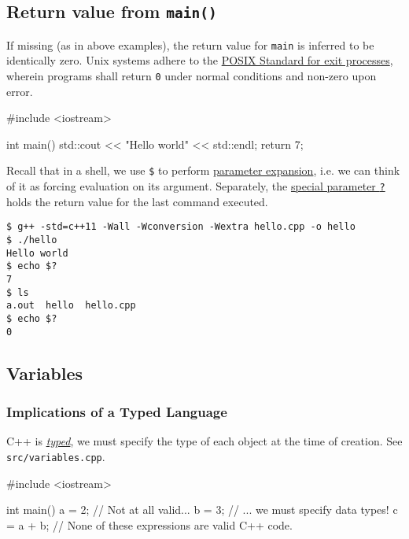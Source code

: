 \documentclass[12pt,letterpaper,twoside]{article}
\begin{document}
\subsection{\texorpdfstring{Return value from \texttt{main()}}{Return value from main()}}
If missing (as in above examples), the return value for \texttt{main}
is inferred to be identically zero.
Unix systems adhere to the
\href{https://en.wikipedia.org/wiki/Exit_status#POSIX}{POSIX
  Standard for exit processes}, wherein programs shall
return \texttt{0} under normal conditions and
non-zero upon error.

\begin{cpp}
#include <iostream>

int main() {
  std::cout << "Hello world" << std::endl;
  return 7;
}
\end{cpp}

Recall that in a shell, we use \texttt{\$} to perform
\href{https://www.gnu.org/software/bash/manual/html_node/Shell-Parameter-Expansion.html#Shell-Parameter-Expansion}{parameter
  expansion}, i.e. we can think of it as forcing evaluation on its
argument.
Separately, the
\href{https://www.gnu.org/software/bash/manual/bash.html#Special-Parameters}{special
  parameter \texttt{?}} holds the return value
for the last command executed.

{\footnotesize
\begin{verbatim}
$ g++ -std=c++11 -Wall -Wconversion -Wextra hello.cpp -o hello
$ ./hello 
Hello world
$ echo $?
7
$ ls
a.out  hello  hello.cpp
$ echo $?
0
\end{verbatim}
}

\subsection{Variables}
\subsubsection{Implications of a Typed Language}
C++ is
\href{https://en.wikipedia.org/wiki/Strong_and_weak_typing#Definitions_of_%22strong%22_or_%22weak%22}{\emph{typed}}, we must specify the type of each object at
the time of creation. See \texttt{src/variables.cpp}.

\begin{cpp}
#include <iostream>

int main() {
  a = 2;               // Not at all valid...
  b = 3;               // ... we must specify data types!
  c = a + b;           // None of these expressions are valid C++ code.
}
\end{cpp}
\end{document}
